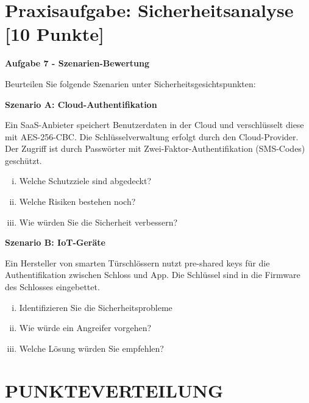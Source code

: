 \documentclass[12pt,a4paper]{article}
\begin{document}
\vspace{2cm}


\newpage

\section{Praxisaufgabe: Sicherheitsanalyse [10 Punkte]}

\textbf{Aufgabe 7 - Szenarien-Bewertung}

Beurteilen Sie folgende Szenarien unter Sicherheitsgesichtspunkten:

\textbf{Szenario A: Cloud-Authentifikation}

Ein SaaS-Anbieter speichert Benutzerdaten in der Cloud und verschlüsselt diese mit AES-256-CBC. Die Schlüsselverwaltung erfolgt durch den Cloud-Provider. Der Zugriff ist durch Passwörter mit Zwei-Faktor-Authentifikation (SMS-Codes) geschützt.

\begin{enumerate}[(i)]
    \item Welche Schutzziele sind abgedeckt?
    \item Welche Risiken bestehen noch?
    \item Wie würden Sie die Sicherheit verbessern?
\end{enumerate}

\vspace{4cm}

\textbf{Szenario B: IoT-Geräte}

Ein Hersteller von smarten Türschlössern nutzt pre-shared keys für die Authentifikation zwischen Schloss und App. Die Schlüssel sind in die Firmware des Schlosses eingebettet.

\begin{enumerate}[(i)]
    \item Identifizieren Sie die Sicherheitsprobleme
    \item Wie würde ein Angreifer vorgehen?
    \item Welche Lösung würden Sie empfehlen?
\end{enumerate}

\vspace{4cm}


\newpage

\section*{PUNKTEVERTEILUNG}
\end{document}
